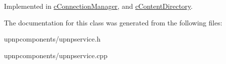 Implemented in \hyperlink{classcConnectionManager_7990eba09a100e5e4ee5b01b87bcc16e}{cConnectionManager}, and \hyperlink{classcContentDirectory_17acd376a722e6e7de9ec0d4cabb707b}{cContentDirectory}.

The documentation for this class was generated from the following files:\begin{CompactItemize}
\item 
upnpcomponents/upnpservice.h\item 
upnpcomponents/upnpservice.cpp\end{CompactItemize}
